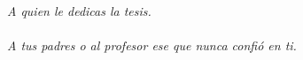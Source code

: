\chapter*{} %
\thispagestyle{empty} %


\begin{flushright}
    \textit{A quien le dedicas la tesis. \\~\\ A tus padres o al profesor ese que nunca confió en ti. }
\end{flushright}

